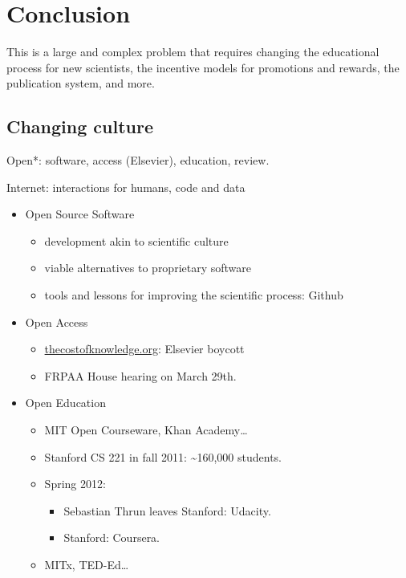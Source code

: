 \documentclass[ChapterTOCs,krantz2]{krantz} %
\begin{document}
\section{Conclusion}\label{conclusion}

This is a large and complex problem that requires changing the educational
process for new scientists, the incentive models for promotions and
rewards, the publication system, and more.


\subsection{Changing culture}

Open{*}: software, access (Elsevier), education, review.

Internet: interactions for humans, code and data

\begin{itemize}
\item Open Source Software

\begin{itemize}
\item development akin to scientific culture
\item viable alternatives to proprietary software
\item tools and lessons for improving the scientific process: Github
\end{itemize}

\item Open Access

\begin{itemize}
\item \url{thecostofknowledge.org}: Elsevier boycott
\item FRPAA House hearing on March 29th.
\end{itemize}

\item Open Education

\begin{itemize}
\item MIT Open Courseware, Khan Academy\ldots
\item Stanford CS 221 in fall 2011: \textasciitilde{}160,000 students.
\item Spring 2012:

\begin{itemize}
\item Sebastian Thrun leaves Stanford: Udacity.
\item Stanford: Coursera.
\end{itemize}
\item MITx, TED-Ed\ldots
\end{itemize}
\end{itemize}
\end{document}
